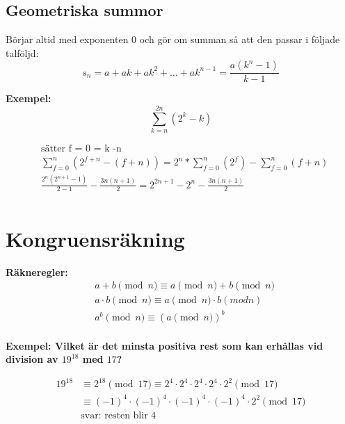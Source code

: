 \begin{multicols}{2}
\subsection{Geometriska summor}
Börjar altid med exponenten 0 och gör om summan så att den passar i följade talföljd:
\begin{equation*}
s _ { n } = a + a k + a k ^ { 2 } + \ldots + a k ^ { n - 1 } = \frac { a \left( k ^ { n } - 1 \right) } { k - 1 }
\end{equation*}


\textbf{Exempel:}
\begin{equation*}
\displaystyle\sum _ { k = n } ^ { 2n } (2^{k} - k)
\end{equation*}

\begin{align*}
  &\text{sätter f = 0 = k -n} \\
  &\displaystyle\sum _ { f = 0 } ^ { n } (2^{f+n} - (f+n)) = 2^{n} * \displaystyle\sum _ { f = 0 } ^ { n } (2^{f}) - \displaystyle\sum _ { f = 0 } ^ { n } (f+n) \\
  &\frac{2^{n} (2^{n+1} -1)}{2-1} - \frac{3n(n+1)}{2} = 2^{2n+1} - 2^{n} - \frac{3n(n+1)}{2}\\
\end{align*}


\section{Kongruensräkning}
\textbf{Räkneregler:}
\begin{align*}
  &a+b \pmod{n} \equiv a \pmod{n} + b \pmod{n} \\
  &a \cdot b \pmod{n} \equiv a \pmod{n} \cdot  b(modn) \\
  &a^b \pmod{n} \equiv (a \pmod{n})^b \\
\end{align*}

\textbf{Exempel: Vilket är det minsta positiva rest som kan erhållas vid division av $19^{18}$ med $17$? }\par
\begin{align*}
  19^{18} &\equiv 2^{18} \pmod{17} \equiv 2^4 \cdot 2^4 \cdot 2^4 \cdot 2^4 \cdot 2^2 \pmod{17} \\
  &\equiv {(-1)}^4 \cdot {(-1)}^4 \cdot {(-1)}^4 \cdot {(-1)}^4 \cdot 2^2 \pmod{17} \\
  &\text{svar: resten blir } 4 \\
\end{align*}



\end{multicols}
